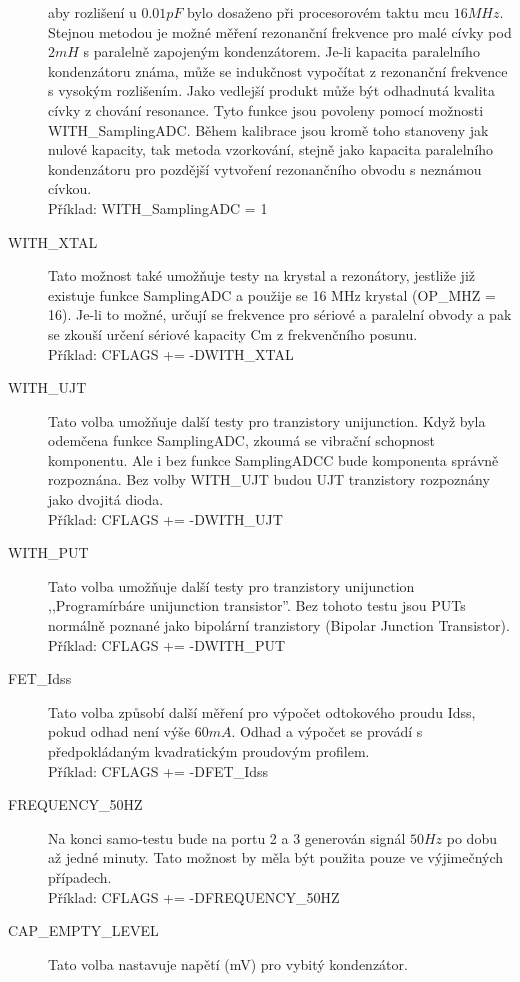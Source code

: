 \begin{description}
aby rozlišení u \(0.01pF\) bylo dosaženo při procesorovém taktu mcu \(16MHz\).
Stejnou metodou je možné měření rezonanční frekvence pro malé cívky pod \(2mH\) s paralelně
zapojeným kondenzátorem.
Je-li kapacita paralelního kondenzátoru známa, může se indukčnost vypočítat z rezonanční
frekvence s vysokým rozlišením.
Jako vedlejší produkt může být odhadnutá kvalita cívky z chování resonance.
Tyto funkce jsou povoleny pomocí možnosti WITH\_SamplingADC.
Během kalibrace jsou kromě toho stanoveny jak nulové kapacity, tak metoda vzorkování,
stejně jako kapacita paralelního kondenzátoru pro pozdější vytvoření rezonančního obvodu s neznámou cívkou.\\
Příklad: WITH\_SamplingADC = 1
  \item[WITH\_XTAL]
Tato možnost také umožňuje testy na krystal a rezonátory, jestliže již existuje funkce SamplingADC
a použije se 16 MHz krystal (OP\_MHZ = 16).
Je-li to možné, určují se frekvence pro sériové a paralelní obvody a pak se zkouší
určení sériové kapacity Cm z frekvenčního posunu.\\
Příklad: CFLAGS += -DWITH\_XTAL
  \item[WITH\_UJT]
Tato volba umožňuje další testy pro tranzistory unijunction.
Když byla odemčena funkce SamplingADC, zkoumá se vibrační schopnost komponentu.
Ale i bez funkce SamplingADCC bude komponenta správně rozpoznána.
Bez volby WITH\_UJT budou UJT tranzistory rozpoznány jako dvojitá dioda.\\
Příklad: CFLAGS += -DWITH\_UJT
  \item[WITH\_PUT]
Tato volba umožňuje další testy pro tranzistory unijunction ,,Programírbáre unijunction transistor''.
Bez tohoto testu jsou PUTs normálně poznané jako bipolární tranzistory (Bipolar Junction Transistor).\\
Příklad: CFLAGS += -DWITH\_PUT
 \item[FET\_Idss]
Tato volba způsobí další měření pro výpočet odtokového proudu Idss, pokud odhad není
výše \(60mA\). Odhad a výpočet se provádí s předpokládaným kvadratickým proudovým profilem.\\
Příklad: CFLAGS += -DFET\_Idss
  \item[FREQUENCY\_50HZ] Na konci samo-testu bude na portu 2 a 3 generován signál \(50Hz\) po
dobu až jedné minuty.
Tato možnost by měla být použita pouze ve výjimečných případech.\\
Příklad: CFLAGS += -DFREQUENCY\_50HZ
  \item[CAP\_EMPTY\_LEVEL] Tato volba nastavuje napětí (mV) pro vybitý kondenzátor.

\end{description}
